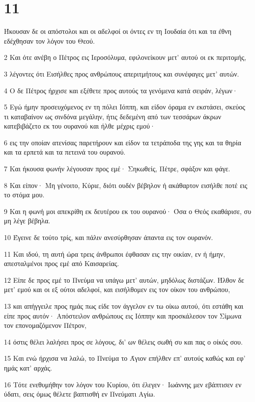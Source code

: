 \chapter{11}

\par Ήκουσαν δε οι απόστολοι και οι αδελφοί οι όντες εν τη Ιουδαία ότι και τα έθνη εδέχθησαν τον λόγον του Θεού.
\par 2 Και ότε ανέβη ο Πέτρος εις Ιεροσόλυμα, εφιλονείκουν μετ' αυτού οι εκ περιτομής,
\par 3 λέγοντες ότι Εισήλθες προς ανθρώπους απεριτμήτους και συνέφαγες μετ' αυτών.
\par 4 Ο δε Πέτρος ήρχισε και εξέθετε προς αυτούς τα γενόμενα κατά σειράν, λέγων·
\par 5 Εγώ ήμην προσευχόμενος εν τη πόλει Ιόππη, και είδον όραμα εν εκστάσει, σκεύος τι καταβαίνον ως σινδόνα μεγάλην, ήτις δεδεμένη από των τεσσάρων άκρων κατεβιβάζετο εκ του ουρανού και ήλθε μέχρις εμού·
\par 6 εις την οποίαν ατενίσας παρετήρουν και είδον τα τετράποδα της γης και τα θηρία και τα ερπετά και τα πετεινά του ουρανού.
\par 7 Και ήκουσα φωνήν λέγουσαν προς εμέ· Σηκωθείς, Πέτρε, σφάξον και φάγε.
\par 8 Και είπον· Μη γένοιτο, Κύριε, διότι ουδέν βέβηλον ή ακάθαρτον εισήλθε ποτέ εις το στόμα μου.
\par 9 Και η φωνή μοι απεκρίθη εκ δευτέρου εκ του ουρανού· Όσα ο Θεός εκαθάρισε, συ μη λέγε βέβηλα.
\par 10 Έγεινε δε τούτο τρίς, και πάλιν ανεσύρθησαν άπαντα εις τον ουρανόν.
\par 11 Και ιδού, τη αυτή ώρα τρεις άνθρωποι έφθασαν εις την οικίαν, εν ή ήμην, απεσταλμένοι προς εμέ από Καισαρείας.
\par 12 Είπε δε προς εμέ το Πνεύμα να υπάγω μετ' αυτών, μηδόλως διστάζων. Ήλθον δε μετ' εμού και οι εξ ούτοι αδελφοί, και εισήλθομεν εις τον οίκον του ανθρώπου,
\par 13 και απήγγειλε προς ημάς πως είδε τον άγγελον εν τω οίκω αυτού, ότι εστάθη και είπε προς αυτόν· Απόστειλον ανθρώπους εις Ιόππην και προσκάλεσον τον Σίμωνα τον επονομαζόμενον Πέτρον,
\par 14 όστις θέλει λαλήσει προς σε λόγους, δι' ων θέλεις σωθή συ και πας ο οίκός σου.
\par 15 Και ενώ ήρχισα να λαλώ, το Πνεύμα το Άγιον επήλθεν επ' αυτούς καθώς και εφ' ημάς κατ' αρχάς.
\par 16 Τότε ενεθυμήθην τον λόγον του Κυρίου, ότι έλεγεν· Ιωάννης μεν εβάπτισεν εν ύδατι, σεις όμως θέλετε βαπτισθή εν Πνεύματι Αγίω.
